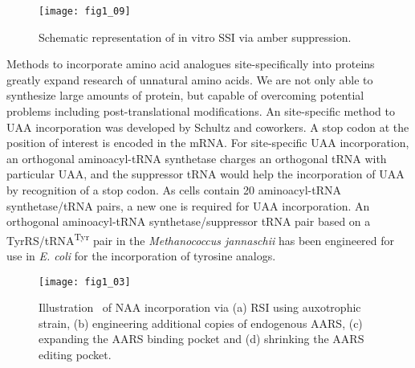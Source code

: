 \begin{refsection}
\begin{figure}[h!] \centering \texttt{[image: fig1\_09]}
    \caption[Schematic representation of in vitro SSI via amber
    suppression.]{Schematic representation of in vitro SSI via amber
    suppression.} 
    \label{fig:ssi-intro} 
\end{figure}

Methods to incorporate amino acid analogues site-specifically into proteins
 greatly expand research of unnatural amino acids. We are not
only able to synthesize large amounts of protein, but capable of overcoming
potential problems including post-translational modifications. An  site-specific method to UAA incorporation was developed by Schultz and
coworkers\cite{Wang2001,Wang2002}. A stop codon at the position of interest is
encoded in the mRNA. For  site-specific UAA incorporation, an
orthogonal aminoacyl-tRNA synthetase charges an orthogonal tRNA with particular
UAA, and the suppressor tRNA would help the incorporation of UAA by recognition
of a stop codon. As cells contain 20 aminoacyl-tRNA synthetase/tRNA pairs, a
new one is required for UAA incorporation. An orthogonal aminoacyl-tRNA
synthetase/suppressor tRNA pair based on a TyrRS/tRNA\textsuperscript{Tyr} pair
in the \emph{Methanococcus jannaschii} has been engineered for use in \emph{E.
coli} for the incorporation of tyrosine analogs\cite{Wang2001}.

\begin{figure}[h!] \centering \texttt{[image: fig1\_03]} 
    \caption[Illustration  of NAA incorporation via (a) RSI using auxotrophic
    strain, (b) engineering additional copies of endogenous AARS, (c) expanding
the AARS binding pocket and (d) shrinking the AARS editing
pocket.]{Illustration  of NAA incorporation via (a) RSI using auxotrophic
strain, (b) engineering additional copies of endogenous AARS, (c) expanding the
AARS binding pocket and (d) shrinking the AARS editing pocket.} \label{fig:rsi} 
\end{figure}


\end{refsection}

